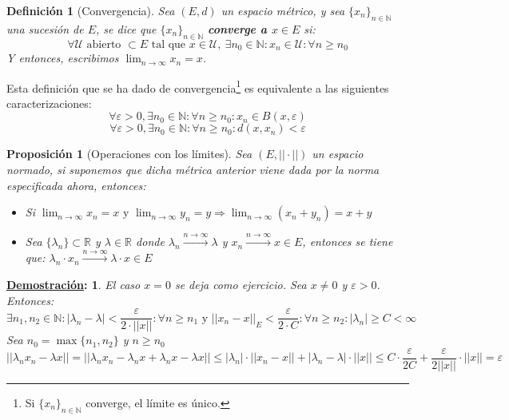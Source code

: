 \documentclass[10pt,a4paper,openright]{book}
\theoremstyle{break}
\newtheorem*{defi}{Definición}
\newtheorem*{prop}{Proposición}
\newtheorem*{demo}{\underline{Demostración}:}
\begin{document}
\begin{defi}[Convergencia]
Sea $(E,d)$ un espacio métrico, y sea $\{x_n\}_{n \in \mathbb{N}}$ una sucesión de $E$, se dice que $\{x_n\}_{n \in \mathbb{N}}$ \textbf{converge a $x \in E$} si:
$$\forall \mathcal{U} \mbox{ abierto } \subset E \mbox{ tal que } x\in \mathcal{U}, \ \exists n_0 \in \mathbb{N} : x_n \in \mathcal{U} : \forall n \geq n_0$$
Y entonces, escribimos $\lim_{n \to \infty} x_n = x$.
\end{defi}

Esta definición que se ha dado de convergencia\footnote{Si $\{x_n\}_{n \in \mathbb{N}}$ converge, el límite es único.} es equivalente a las siguientes caracterizaciones:
$$\forall \varepsilon > 0, \exists n_0 \in \mathbb{N} :  \forall n \geq n_0: x_n \in B(x, \varepsilon )$$
$$\forall \varepsilon > 0, \exists n_0 \in \mathbb{N} : \forall n \geq n_0 : d(x,x_n) < \varepsilon$$

\begin{prop}[Operaciones con los límites]
Sea $(E, || \cdot ||)$ un espacio normado, si suponemos que dicha métrica anterior viene dada por la norma especificada ahora, entonces:
\begin{itemize}
\item Si $\lim_{n \to \infty} x_n = x \mbox{ y } \lim_{n \to \infty} y_n = y \Rightarrow \lim_{n \to \infty} (x_n + y_n) = x + y$
\item Sea $\{\lambda_n\} \subset \mathbb{R}$ y $\lambda \in \mathbb{R}$ donde $ \lambda_n \xrightarrow{n\rightarrow\infty}\lambda$ y $x_n \xrightarrow{n\rightarrow\infty} x \in E$, entonces se tiene que: $\lambda_n \cdot x_n \xrightarrow{n\rightarrow\infty} \lambda \cdot x \in E$
\end{itemize}
\end{prop}

\begin{demo}
El caso $x = 0$ se deja como ejercicio. Sea $x \neq 0$ y $\varepsilon > 0$. Entonces:
$$\exists n_1, n_2 \in \mathbb{N} : | \lambda_n - \lambda | < \frac{\varepsilon}{2 \cdot ||x||} : \forall n \geq n_1 \mbox{ y } ||x_n - x||_E < \frac{\varepsilon}{2 \cdot C} : \forall n \geq n_2 : |\lambda_n| \geq C < \infty$$
Sea $n_0 = \max\{n_1, n_2\}$ y $n \geq n_0$
$$||\lambda_n x_n - \lambda x || = ||\lambda_n x_n - \lambda_n x + \lambda_n x - \lambda x || \leq |\lambda_n| \cdot ||x_n - x|| + |\lambda_n - \lambda | \cdot ||x|| \leq C \cdot \frac{\varepsilon}{2C} + \frac{\varepsilon}{2||x||}\cdot ||x|| = \varepsilon$$
\end{demo}
\end{document}
